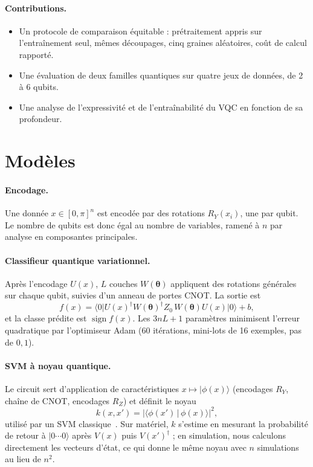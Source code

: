 \documentclass[10pt,a4paper,twocolumn]{article}
\newcommand{\ket}[1]{\lvert #1 \rangle}
\newcommand{\bra}[1]{\langle #1 \rvert}
\begin{document}
\paragraph{Contributions.}
\begin{itemize}\setlength\itemsep{0pt}
  \item Un protocole de comparaison équitable : prétraitement appris sur l'entraînement seul,
        mêmes découpages, cinq graines aléatoires, coût de calcul rapporté.
  \item Une évaluation de deux familles quantiques sur quatre jeux de données, de 2 à 6 qubits.
  \item Une analyse de l'expressivité et de l'entraînabilité du VQC en fonction de sa profondeur.
\end{itemize}

\section{Modèles}

\paragraph{Encodage.}
Une donnée $x \in [0,\pi]^n$ est encodée par des rotations $R_Y(x_i)$, une par qubit. Le nombre de
qubits est donc égal au nombre de variables, ramené à $n$ par analyse en composantes principales.

\paragraph{Classifieur quantique variationnel.}
Après l'encodage $U(x)$, $L$ couches $W(\boldsymbol\theta)$ appliquent des rotations générales sur
chaque qubit, suivies d'un anneau de portes CNOT. La sortie est
\begin{equation}
  f(x) = \bra{0}U(x)^\dagger W(\boldsymbol\theta)^\dagger Z_0\, W(\boldsymbol\theta)U(x)\ket{0} + b,
\end{equation}
et la classe prédite est $\operatorname{sign} f(x)$. Les $3nL+1$ paramètres minimisent l'erreur
quadratique par l'optimiseur Adam (60 itérations, mini-lots de 16 exemples, pas de $0{,}1$).

\paragraph{SVM à noyau quantique.}
Le circuit sert d'application de caractéristiques $x \mapsto \ket{\phi(x)}$ (encodages $R_Y$, chaîne
de CNOT, encodages $R_Z$) et définit le noyau
\begin{equation}
  k(x,x') = \lvert\langle\phi(x')\,|\,\phi(x)\rangle\rvert^2 ,
\end{equation}
utilisé par un SVM classique~\cite{havlicek2019}. Sur matériel, $k$ s'estime en mesurant la
probabilité de retour à $\ket{0\cdots0}$ après $V(x)$ puis $V(x')^\dagger$ ; en simulation, nous
calculons directement les vecteurs d'état, ce qui donne le même noyau avec $n$ simulations au
lieu de $n^2$.
\end{document}

